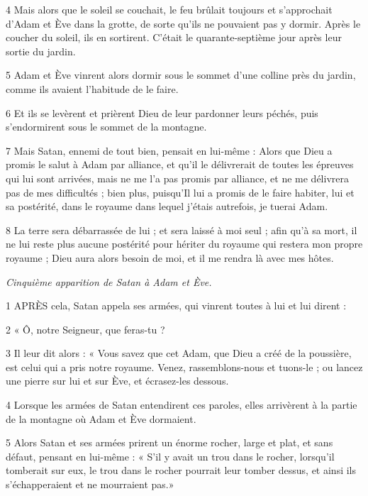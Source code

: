 \par 4 Mais alors que le soleil se couchait, le feu brûlait toujours et s'approchait d'Adam et Ève dans la grotte, de sorte qu'ils ne pouvaient pas y dormir. Après le coucher du soleil, ils en sortirent. C'était le quarante-septième jour après leur sortie du jardin.

\par 5 Adam et Ève vinrent alors dormir sous le sommet d'une colline près du jardin, comme ils avaient l'habitude de le faire.

\par 6 Et ils se levèrent et prièrent Dieu de leur pardonner leurs péchés, puis s'endormirent sous le sommet de la montagne.

\par 7 Mais Satan, ennemi de tout bien, pensait en lui-même : Alors que Dieu a promis le salut à Adam par alliance, et qu'il le délivrerait de toutes les épreuves qui lui sont arrivées, mais ne me l'a pas promis par alliance, et ne me délivrera pas de mes difficultés ; bien plus, puisqu'Il lui a promis de le faire habiter, lui et sa postérité, dans le royaume dans lequel j'étais autrefois, je tuerai Adam.

\par 8 La terre sera débarrassée de lui ; et sera laissé à moi seul ; afin qu'à sa mort, il ne lui reste plus aucune postérité pour hériter du royaume qui restera mon propre royaume ; Dieu aura alors besoin de moi, et il me rendra là avec mes hôtes.


\par \textit{Cinquième apparition de Satan à Adam et Ève.}

\par 1 APRÈS cela, Satan appela ses armées, qui vinrent toutes à lui et lui dirent :

\par 2 « Ô, notre Seigneur, que feras-tu ?

\par 3 Il leur dit alors : « Vous savez que cet Adam, que Dieu a créé de la poussière, est celui qui a pris notre royaume. Venez, rassemblons-nous et tuons-le ; ou lancez une pierre sur lui et sur Ève, et écrasez-les dessous.

\par 4 Lorsque les armées de Satan entendirent ces paroles, elles arrivèrent à la partie de la montagne où Adam et Ève dormaient.

\par 5 Alors Satan et ses armées prirent un énorme rocher, large et plat, et sans défaut, pensant en lui-même : « S'il y avait un trou dans le rocher, lorsqu'il tomberait sur eux, le trou dans le rocher pourrait leur tomber dessus, et ainsi ils s'échapperaient et ne mourraient pas.»

